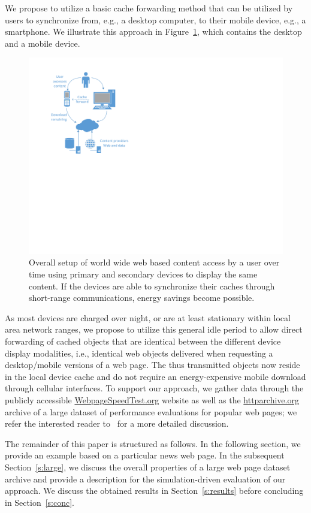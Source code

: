 \documentclass[letterpaper,conference]{IEEEtran}
\begin{document}
We propose to utilize a basic cache forwarding method that can be utilized by users to synchronize from, e.g., a desktop computer, to their mobile device, e.g., a smartphone.
We illustrate this approach in Figure~\ref{fig:setup}, which contains the desktop and a mobile device. 
\begin{figure}
	\centering
	\includegraphics[width=.9\linewidth]{Drawing1}
	\caption{Overall setup of world wide web based content access by a user over time using primary and secondary devices to display the same content. If the devices are able to synchronize their caches through short-range communications, energy savings become possible.}
	\label{fig:setup}
\end{figure}
As most devices are charged over night, or are at least stationary within local area network ranges, we propose to utilize this general idle period to allow direct forwarding of cached objects that are identical between the different device display modalities, i.e., identical web objects delivered when requesting a desktop/mobile versions of a web page.
The thus transmitted objects now reside in the local device cache and do not require an energy-expensive mobile download through cellular interfaces.
To support our approach, we gather data through the publicly accessible \url{WebpageSpeedTest.org} website as well as the \url{httparchive.org} archive of a large dataset of performance evaluations for popular web pages; we refer the interested reader to~\cite{Me13} for a more detailed discussion.

The remainder of this paper is structured as follows.
In the following section, %
we provide an example based on a particular news web page.
In the subsequent Section~\ref{s:large}, we discuss the overall properties of a large web page dataset archive and provide a description for the simulation-driven evaluation of our approach. We discuss the obtained results in Section~\ref{s:results} before concluding in Section~\ref{s:conc}.
\end{document}
